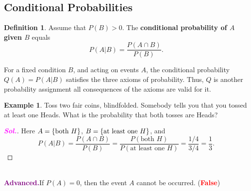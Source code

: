 \documentclass[12pt,a4paper]{article}
\theoremstyle{definition}
\newtheorem{example}{Example}[section]
\theoremstyle{definition}
\newtheorem*{definition}{Definition}
\theoremstyle{definition}
\theoremstyle{definition}
\theoremstyle{remark}
\theoremstyle{definition}
\newcommand{\sol}{\textcolor{magenta}{\bf \textit{Sol.}}\quad}
\begin{document}
\subsection{Conditional Probabilities}
\begin{tcolorbox}[colback=white]
	\begin{definition}
		Assume that $P(B)>0$. The \textbf{conditional probability of $A$ given $B$} equals \[
		P(A|B)=\frac{P(A\cap B)}{P(B)}.
		\]
	\end{definition}
\end{tcolorbox} For a fixed condition $B$, and acting on events $A$, the conditional probability $Q(A)=P(A|B)$ satisfies the three axioms of probability. Thus, $Q$ is another probability assignment all consequences of the axioms are valid for it.\
\\
\begin{example}
	Toss two fair coins, blindfolded. Somebody tells you that you tossed at least one Heads. What is the probability that both tosses are Heads?\begin{proof}[\sol]
		Here $A=\set{\text{both}\ H}$, $B=\set{\text{at least one}\ H}$, and \[
		P(A|B)=\frac{P(A\cap B)}{P(B)}=\frac{P(\text{both $H$})}{P(\text{at least one $H$})}=\frac{1/4}{3/4}=\frac{1}{3}.
		\]
	\end{proof}
\end{example}\
\\
\textcolor{purple}{\bf Advanced.}\quad If $P(A)=0$, then the event $A$ cannot be occurred. (\textcolor{red}{\bf False})
\end{document}
